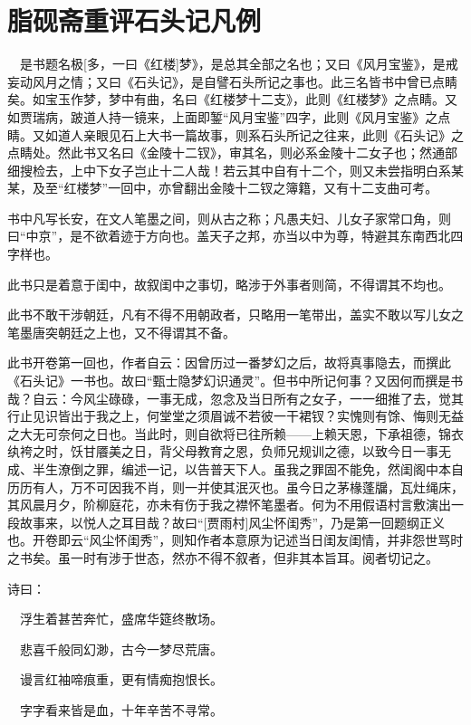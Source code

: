 \chapter{脂砚斋重评石头记凡例}

{　是书题名极{[}多，一曰《红楼]\kaishu 梦》，是总其全部之名也；又曰《风月宝鉴》，是戒妄动风月之情；又曰《石头记》，是自譬石头所记之事也。此三名皆书中曾已点睛矣。如宝玉作梦，梦中有曲，名曰《红楼梦十二支》，此则《红楼梦》之点睛。又如贾瑞病，跛道人持一镜来，上面即錾``风月宝鉴''四字，此则《风月宝鉴》之点睛。又如道人亲眼见石上大书一篇故事，则系石头所记之往来，此则《石头记》之点睛处。然此书又名曰《金陵十二钗》，审其名，则必系金陵十二女子也；然通部细搜检去，上中下女子岂止十二人哉！若云其中自有十二个，则又未尝指明白系某某，及至``红楼梦''一回中，亦曾翻出金陵十二钗之簿籍，又有十二支曲可考。}

{\kaishu 书中凡写长安，在文人笔墨之间，则从古之称；凡愚夫妇、儿女子家常口角，则曰``中京''，是不欲着迹于方向也。盖天子之邦，亦当以中为尊，特避其东南西北四字样也。}

{\kaishu 此书只是着意于闺中，故叙闺中之事切，略涉于外事者则简，不得谓其不均也。}

{\kaishu 此书不敢干涉朝廷，凡有不得不用朝政者，只略用一笔带出，盖实不敢以写儿女之笔墨唐突朝廷之上也，又不得谓其不备。}

{\kaishu 此书开卷第一回也，作者自云：因曾历过一番梦幻之后，故将真事隐去，而撰此《石头记》一书也。故曰``甄士隐梦幻识通灵''。但书中所记何事？又因何而撰是书哉？自云：今风尘碌碌，一事无成，忽念及当日所有之女子，一一细推了去，觉其行止见识皆出于我之上，何堂堂之须眉诚不若彼一干裙钗？实愧则有馀、悔则无益之大无可奈何之日也。当此时，则自欲将已往所赖------上赖天恩，下承祖德，锦衣纨袴之时，饫甘餍美之日，背父母教育之恩，负师兄规训之德，以致今日一事无成、半生潦倒之罪，编述一记，以告普天下人。虽我之罪固不能免，然闺阁中本自历历有人，万不可因我不肖，则一并使其泯灭也。虽今日之茅椽蓬牖，瓦灶绳床，其风晨月夕，阶柳庭花，亦未有伤于我之襟怀笔墨者。何为不用假语村言敷演出一段故事来，以悦人之耳目哉？故曰``{[}贾雨村{]}风尘怀闺秀''，乃是第一回题纲正义也。开卷即云``风尘怀闺秀''，则知作者本意原为记述当日闺友闺情，并非怨世骂时之书矣。虽一时有涉于世态，然亦不得不叙者，但非其本旨耳。阅者切记之。}

{\kaishu 诗曰：}

{\kaishu 　浮生着甚苦奔忙，盛席华筵终散场。}

{\kaishu 　悲喜千般同幻渺，古今一梦尽荒唐。}

{\kaishu 　谩言红袖啼痕重，更有情痴抱恨长。}

{\kaishu 　字字看来皆是血，十年辛苦不寻常。}

